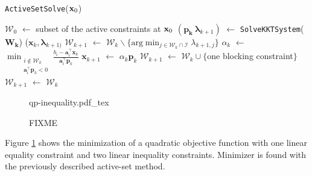 \begin{algorithm}
\caption{\texttt{ActiveSetSolve}($\mathbf{x}_0$)}
\label{alg:chap3-active-set}
\begin{algorithmic}
\STATE $\mathcal{W}_0$ $\leftarrow$ subset of the active constraints at $\mathbf{x}_0$
\STATE $(\mathbf{p_k}~\boldsymbol{\lambda}_{k+1})$ $\leftarrow$ \texttt{SolveKKTSystem}($\mathbf{W_k}$)
\RETURN ($\mathbf{x}_k,\boldsymbol{\lambda}_{k+1)}$
\ELSE
{}
\STATE $\mathcal{W}_{k+1}$ $\leftarrow$ $\mathcal{W}_k \backslash \{\text{arg}\min_{j\in\mathcal{W}_k\cap\mathcal{I}}\lambda_{k+1,j}\}$
\ENDIF
\ELSE
{}
\STATE $\alpha_k$ $\leftarrow$ $\min_{\substack{i\notin\mathcal{W}_k\\\mathbf{a}_i^{\top}\mathbf{p}_k<0}} \frac{b_i-\mathbf{a}_i^{\top}\mathbf{x}_k}{\mathbf{a}_i^{\top}\mathbf{p}_k}$
\STATE $\mathbf{x}_{k+1}$ $\leftarrow$ $\alpha_k\mathbf{p}_k$
\STATE $\mathcal{W}_{k+1}$ $\leftarrow$ $\mathcal{W}_k\cup\{$one blocking constraint$\}$
\ELSE
{}
\STATE $\mathcal{W}_{k+1}$ $\leftarrow$ $\mathcal{W}_k$
\ENDIF
\ENDIF
\ENDFOR
\end{algorithmic}
\end{algorithm}

\begin{figure}
  \centering
      {\def\svgwidth{0.5\linewidth}
        {\footnotesize
          
                     {qp-inequality.pdf_tex}
        }
      }
      \caption{FIXME}
      \label{fig:chap3-qp-inequality}
\end{figure}

Figure \ref{fig:chap3-qp-inequality} shows the minimization of a
quadratic objective function with one linear equality constraint and
two linear inequality constraints. Minimizer is found with the
previously described active-set method.

